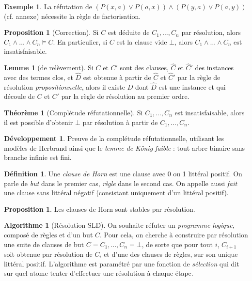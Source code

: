 \documentclass[a4paper, 11pt, twocolumn]{article}
\theoremstyle{definition}
\newtheorem{definition}[equation]{Définition}
\newtheorem{example}[equation]{Exemple}
\newtheorem{proposition}[equation]{Proposition}
\newtheorem{theorem}[equation]{Théorème}
\newtheorem{algo}[equation]{Algorithme}
\newtheorem{lemma}[equation]{Lemme}
\newcounter{n}
\newtheorem{dev}[n]{Développement}
\begin{document}
\begin{example}
  La réfutation de $(P(x,a) \lor P(a,x)) \land (P(y,a) \lor P(a,y))$ (cf.
  annexe) nécessite la règle de factorisation.
\end{example}

\begin{proposition}[Correction]
  Si $C$ est déduite de $C_1, \ldots, C_n$ par résolution, alors $C_1 \land
  \ldots \land C_n \models C$. En particulier, si $C$ est la clause vide $\bot$,
  alors $C_1 \land \ldots \land C_n$ est insatisfaisable.
\end{proposition}

\begin{lemma}[de relèvement]
  Si $C$ et $C'$ sont des clauses, $\hat{C}$ et $\hat{C}'$ des instances avec
  des termes clos, et $\hat{D}$ est obtenue à partir de $\hat{C}$ et $\hat{C}'$
  par la règle de résolution \emph{propositionnelle}, alors il existe $D$ dont 
  $\hat{D}$ est une instance et qui découle de $C$ et $C'$ par la règle de
  résolution au premier ordre.
\end{lemma}

\begin{theorem}[Complétude réfutationnelle]
  Si $C_1, \ldots, C_n$ est insatisfaisable, alors il est possible d'obtenir
  $\bot$ par résolution à partir de $C_1, \ldots, C_n$.
\end{theorem}

\begin{dev}
  Preuve de la complétude réfutationnelle, utilisant les modèles de Herbrand
  ainsi que le \emph{lemme de König faible} : tout arbre binaire sans branche
  infinie est fini.
\end{dev}

\begin{definition}
  Une \emph{clause de Horn} est une clause avec 0 ou 1 littéral positif. On
  parle de \emph{but} dans le premier cas, \emph{règle} dans le second cas. On
  appelle aussi \emph{fait} une clause sans littéral négatif (consistant
  uniquement d'un littéral positif).
\end{definition}

\begin{proposition}
  Les clauses de Horn sont stables par résolution.
\end{proposition}

\begin{algo}[Résolution SLD]
  On souhaite réfuter un \emph{programme logique}, composé de règles et d'un but
  $C$. Pour cela, on cherche à construire par résolution une suite de clauses de
  but $C = C_1, \ldots, C_n = \bot$, de sorte que pour tout $i$, $C_{i+1}$ soit
  obtenue par résolution de $C_i$ et d'une des clauses de règles, sur son unique
  littéral positif. L'algorithme est paramétré par une fonction de
  \emph{sélection} qui dit sur quel atome tenter d'effectuer une résolution à
  chaque étape.
\end{algo}
\end{document}

